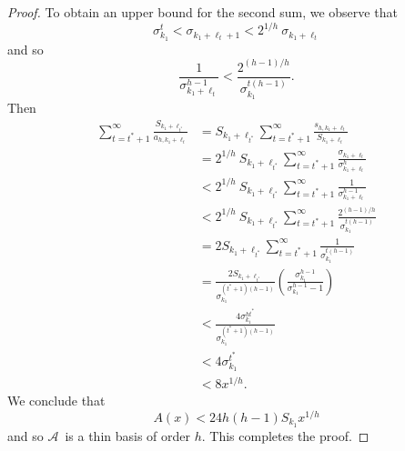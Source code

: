 \documentclass{amsart}
\begin{document}
\begin{proof}
To obtain an upper bound for the second sum, we observe that 
\[
\sigma_{k_1}^t < \sigma_{k_1+\ell_t + 1} 
< 2^{1/h} \ \sigma_{k_1+\ell_t} 
\]
and so
\[
\frac{1}{\sigma_{k_1+\ell_t}^{h-1} } 
< \frac{ 2^{(h-1)/h}}{ \sigma_{k_1}^{t(h-1)}}.
\]
Then
\begin{align*}
\sum_{t = t^*+1}^{\infty} \frac{S_{k_1+ \ell_{t^*}}}{a_{h,{k_1}+\ell_t}} 
& = S_{k_1+ \ell_{t^*}}  \sum_{t = t^*+1}^{\infty} \frac{s_{h,k_1+\ell_t}}{S_{k_1+ \ell_t}} \\
& = 2^{1/h} \  S_{k_1+ \ell_{t^*}}
\sum_{t = t^*+1}^{\infty} \frac{\sigma_{k_1+\ell_t}}{\sigma_{k_1+ \ell_t}^h} \\
& <  2^{1/h} \ S_{k_1+ \ell_{t^*}}
\sum_{t = t^*+1}^{\infty} \frac{1}{\sigma_{k_1+ \ell_t}^{h-1}} \\
& <  2^{1/h} \ S_{k_1+ \ell_{t^*}}
\sum_{t = t^*+1}^{\infty} \frac{ 2^{(h-1)/h} }{\sigma_{k_1}^{t(h-1)}} \\
& = 2S_{k_1 + \ell_{t^*}}
\sum_{t = t^*+1}^{\infty} \frac{1}{\sigma_{k_1}^{t(h-1)}} \\
& = \frac{2S_{k_1 + \ell_{t^*}}}{\sigma_{k_1}^{(t^*+1)(h-1)}}
\left(  \frac{\sigma_{k_1}^{h-1}}{  \sigma_{k_1}^{h-1} - 1}  \right)\\
& < \frac{4\sigma_{k_1}^{ht^*}}{\sigma_{k_1}^{(t^*+1)(h-1)}}  \\
& < 4\sigma_{k_1}^{t^*}  \\
& < 8x^{1/h}.
\end{align*}
We conclude that 
\[
A(x) < 24h(h-1)S_{k_1} x^{1/h}
\]
and so {\ensuremath{ \mathcal A}}\ is a thin basis of order $h$.  
This completes the proof.
\end{proof}
\end{document}
